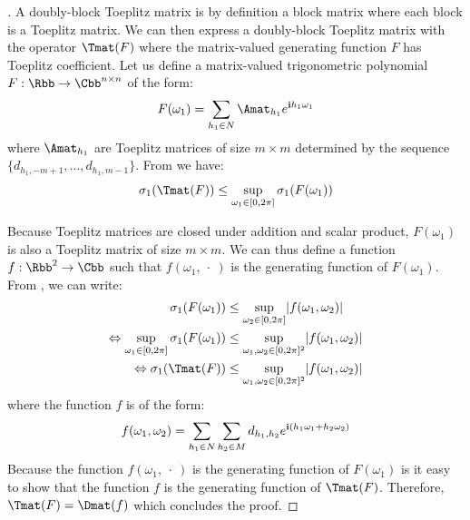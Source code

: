 \begin{proof}[]
  A doubly-block Toeplitz matrix is by definition a block matrix where each block is a Toeplitz matrix. We can then express a doubly-block Toeplitz matrix with the operator $\Tmat(F)$ where the matrix-valued generating function $F$ has Toeplitz coefficient. Let us define a matrix-valued trigonometric polynomial $F:\Rbb\rightarrow\Cbb^{n \times n}$ of the form:
  \begin{equation}
      F(\omega_1) = \sum_{h_1 \in N} \Amat_{h_1}e^{\ci h_1\omega_1}
  \end{equation}
  where $\Amat_{h_1}$ are Toeplitz matrices of size $m \times m$ determined by the sequence $\{d_{h_1, -m+1}, \dots, d_{h_1, m-1} \}$. 
  From  we have:
  \begin{equation}
  \sigma_1\left(\Tmat(F) \right) \leq \sup_{\omega_1 \in [0,2\pi] } \sigma_{1}\left( F(\omega_1) \right) \label{equation:th_bound_block_toeplitz}
  \end{equation}

  Because Toeplitz matrices are closed under addition and scalar product, $F(\omega_1)$ is also a Toeplitz matrix of size $m \times m$. 
  We can thus define a function $f:\Rbb^{2} \rightarrow \Cbb$ such that $f(\omega_1,\ \cdot\ )$ is the generating function of $F(\omega_1)$. From , we can write:
  \begin{align}
      \sigma_{1}\left( F(\omega_1) \right) &\leq \sup_{\omega_2 \in [0,2\pi]} \left| f(\omega_1, \omega_2) \right| \\
      \Leftrightarrow \sup_{\omega_1 \in [0,2\pi]} \sigma_{1}\left( F(\omega_1) \right) &\leq  \sup_{\omega_1, \omega_2 \in [0,2\pi]^2} \left| f(\omega_1, \omega_2) \right| \\
      \Leftrightarrow \sigma_1\left(\Tmat(F) \right) &\leq \sup_{\omega_1, \omega_2 \in [0,2\pi]^2} \left| f(\omega_1, \omega_2) \right|
  \end{align}
  where the function $f$ is of the form:
  \begin{equation}
  f(\omega_1,\omega_2) = \sum_{h_1 \in N} \sum_{h_2 \in M} d_{h_1, h_2} e^{\ci \left( h_1\omega_1 + h_2 \omega_2\right)}
  \end{equation}
  Because the function $f(\omega_1,\ \cdot\ )$ is the generating function of $F(\omega_1)$ is it easy to show that the function $f$ is the generating function of $\Tmat(F)$. Therefore, $\Tmat(F) = \Dmat(f)$ which concludes the proof. 
\end{proof}


